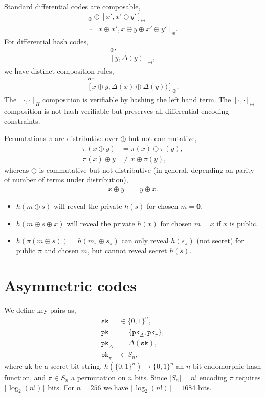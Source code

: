\documentclass[twocolumn, aps, amsmath, amssymb, nofootinbib, superscriptaddress, longbibliography, doublefloatfix, table-of-contents, eqsecnum, rmp]{revtex4-2}
\begin{document}
Standard differential codes are composable,
\begin{align}
	[x,x\oplus y)]_\oplus \oplus [x',x'\oplus y']_\oplus\nonumber\\
	\sim [x\oplus x', x\oplus y \oplus x' \oplus y']_\oplus.
\end{align}
For differential hash codes,
\begin{align}
	[x,\Delta(x)]_\oplus,\nonumber\\
	[y,\Delta(y)]_\oplus,
\end{align}
we have distinct composition rules,
\begin{align}
	[x\oplus y,\Delta(x\oplus y)]_H,\nonumber\\
	[x\oplus y,\Delta(x) \oplus \Delta(y))]_\oplus.
\end{align}
The $[\cdot,\cdot]_H$ composition is verifiable by hashing the left hand term. The $[\cdot,\cdot]_\oplus$ composition is not hash-verifiable but preserves all differential encoding constraints.

Permutations $\pi$ are distributive over $\oplus$ but not commutative,
\begin{align}
	\pi(x\oplus y) &= \pi(x) \oplus \pi(y),\nonumber\\
	\pi(x) \oplus y &\neq x \oplus \pi(y),
\end{align}
whereas $\oplus$ is commutative but not distributive (in general, depending on parity of number of terms under distribution),
\begin{align}
	x\oplus y &= y \oplus x.
\end{align}

\begin{itemize}
	\item $h(m\oplus s)$ will reveal the private $h(s)$ for chosen $m=\mathbf{0}$.
	\item $h(m\oplus s \oplus x)$ will reveal the private $h(x)$ for chosen $m=x$ if $x$ is public.
	\item $h(\pi(m\oplus s)) = h(m_\pi \oplus s_\pi)$ can only reveal $h(s_\pi)$ (not secret) for public $\pi$ and chosen $m$, but cannot reveal secret $h(s)$.
\end{itemize}

\section{Asymmetric codes}

We define key-pairs as,
\begin{align}
	\mathtt{sk} &\in \{0,1\}^n, \nonumber\\
	\mathtt{pk} &= \{\mathtt{pk}_\Delta,\mathtt{pk}_\pi\},\nonumber\\
	\mathtt{pk}_\Delta &= \Delta(\mathtt{sk}),\nonumber\\
	\mathtt{pk}_\pi &\in S_n,
\end{align}
where $\mathtt{sk}$ be a secret bit-string, $h(\{0,1\}^n)\to\{0,1\}^n$ an $n$-bit endomorphic hash function, and $\pi\in S_n$ a permutation on $n$ bits. Since $|S_n|=n!$ encoding $\pi$ requires $\lceil\log_2(n!)\rceil$ bits. For $n=256$ we have $\lceil\log_2(n!)\rceil = 1684$ bits.
\end{document}
